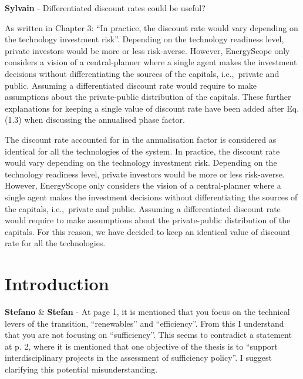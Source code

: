 \documentclass[12pt,a4paper]{article}
\def\ie{i.e.,\ }
\begin{document}
\begin{mdframed}[style=comment] %
{\color{purple} \textbf{Sylvain}} - Differentiated discount rates could be useful? 
\end{mdframed}

\noindent As written in Chapter 3: ``In practice, the discount rate would vary depending on the technology investment risk''. Depending on the technology readiness level, private investors would be more or less risk-averse. However, EnergyScope only considers a vision of a central-planner where a single agent makes the investment decisions without differentiating the sources of the capitals, \ie private and public. Assuming a differentiated discount rate would require to make assumptions about the private-public distribution of the capitals. These further explanations for keeping a single value of discount rate have been added {\color{blue} after Eq. (1.3) when discussing the annualised phase factor}.

\begin{mdframed}[style=manuscript] %
The discount rate accounted for in the annualisation factor is considered as identical for all the technologies of the system. In practice, the discount rate would vary depending on the technology investment risk. Depending on the technology readiness level, private investors would be more or less risk-averse. However, EnergyScope only considers the vision of a central-planner where a single agent makes the investment decisions without differentiating the sources of the capitals, \ie private and public. Assuming a differentiated discount rate would require to make assumptions about the private-public distribution of the capitals. For this reason, we have decided to keep an identical value of discount rate for all the technologies.
\end{mdframed}


\section{Introduction}
\label{Introduction}

\begin{mdframed}[style=comment] %
{\color{orange} \textbf{Stefano}} \& {\color{teal} \textbf{Stefan}} - At page 1, it is mentioned that you focus on the technical levers of the transition, ``renewables'' and ``efficiency''. From this I understand that you are not focusing on ``sufficiency''. This seems to contradict a statement at p. 2, where it is mentioned that one objective of the thesis is to ``support interdisciplinary projects in the assessment of sufficiency policy''. I suggest clarifying this potential misunderstanding.  
\end{mdframed}
\end{document}
